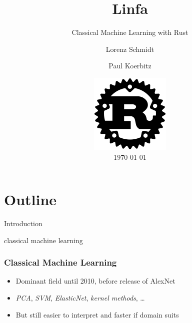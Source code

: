 \documentclass[xcolor=x11names,compress]{beamer}
\author{Lorenz Schmidt \inst{1} \and Paul Koerbitz \inst{2}}
\institute{\it \inst{1} RWTH Aachen \and \inst{2} Google}
\begin{document}
\section{Outline}
\begin{frame}
    \title{Linfa}
    \subtitle{Classical Machine Learning with Rust}
    \date{
        \includegraphics[scale=0.5]{images/rust.png} \\
        \vspace{0.5cm}
        \today
    }
	\titlepage
\end{frame}

\begin{frame}{Introduction}
	\tableofcontents
\end{frame}

\begin{frame}{classical machine learning}
    \frametitle{Classical Machine Learning}

    \begin{itemize}
        \item<1-> Dominant field until 2010, before release of AlexNet
        \item<3-> \textit{PCA}, \textit{SVM}, \textit{ElasticNet}, \textit{kernel methods}, \dots
        \item<4-> But still easier to interpret and faster if domain suits
    \end{itemize}

\end{frame}
\end{document}
